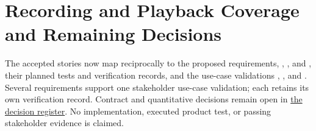 \section{Recording and Playback Coverage and Remaining Decisions}
\label{Section:RecordingPlaybackTraceGaps}
The accepted stories now map reciprocally to the proposed requirements, , ,  and , their planned tests and verification records, and the use-case validations , ,  and . Several requirements support one stakeholder use-case validation; each retains its own verification record. Contract and quantitative decisions remain open in \hyperref[Section:RecordingPlaybackDecisions]{the decision register}. No implementation, executed product test, or passing stakeholder evidence is claimed.
